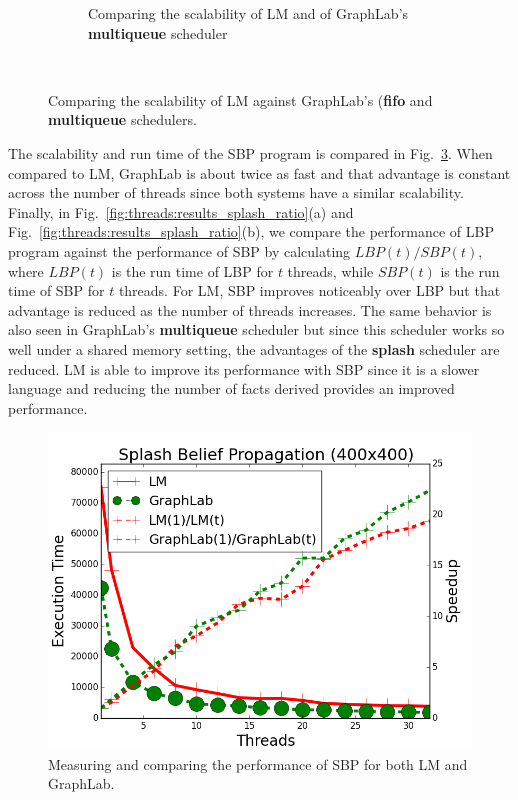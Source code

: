 \begin{figure}[]
\begin{subfigure}[b]{\plotsize\textwidth}
           \caption{Comparing the scalability of LM and of GraphLab's
              \textbf{multiqueue} scheduler}
           \label{fig:threads:splash_multi}
        \end{subfigure} \\
        \caption{Comparing the scalability of LM against GraphLab's (\textbf{fifo}
        and \textbf{multiqueue} schedulers.}
        \label{fig:threads:results_splash}
\end{figure}

The scalability and run time of the SBP program is compared in
Fig.~\ref{fig:threads:results_splash_final}. When compared to LM, GraphLab is
about twice as fast and that advantage is constant across the number of threads
since both systems have a similar scalability. Finally, in
Fig.~\ref{fig:threads:results_splash_ratio}(a) and
Fig.~\ref{fig:threads:results_splash_ratio}(b), we compare the performance of
LBP program against the performance of SBP by calculating $LBP(t)/SBP(t)$, where
$LBP(t)$ is the run time of LBP for $t$ threads, while $SBP(t)$ is the run time
of SBP for $t$ threads. For LM, SBP improves noticeably over LBP but that
advantage is reduced as the number of threads increases. The same behavior is
also seen in GraphLab's \textbf{multiqueue} scheduler but since this scheduler
works so well under a shared memory setting, the advantages of the
\textbf{splash} scheduler are reduced. LM is able to improve its performance
with SBP since it is a slower language and reducing the number of facts derived
provides an improved performance.

\begin{figure}[]
        \centering
        \includegraphics[width=\plotsize\textwidth]{experiments/threads/cmp-splash-bp-400.png}
        \caption{Measuring and comparing the performance of SBP for both LM and
        GraphLab.}
        \label{fig:threads:results_splash_final}
\end{figure}

